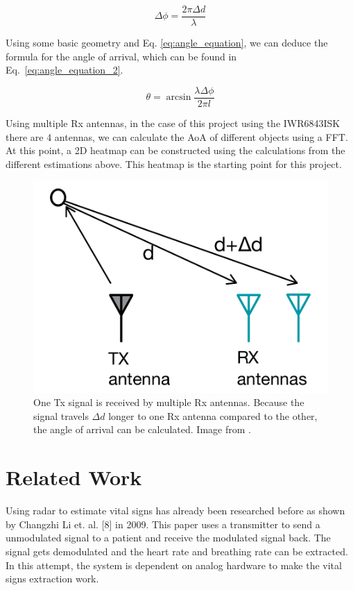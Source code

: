 \begin{equation}
\Delta \phi = \frac{2 \pi \Delta d}{\lambda}
\label{eq:angle_equation}
\end{equation}

Using some basic geometry and Eq. \ref{eq:angle_equation}, we can deduce the formula for the angle of arrival, which can be found in Eq.~\ref{eq:angle_equation_2}.

\begin{equation}
\theta = \arcsin{\frac{\lambda \Delta \phi}{2 \pi l}}
\label{eq:angle_equation_2}
\end{equation}

Using multiple Rx antennas, in the case of this project using the IWR6843ISK there are 4 antennas, we can calculate the AoA of different objects using a FFT. At this point, a 2D heatmap can be constructed using the calculations from the different estimations above. This heatmap is the starting point for this project.

\begin{figure}[t]
\centering
\includegraphics[width=.5\textwidth]{figures/background/angle_estimation.png}
\caption{One Tx signal is received by multiple Rx antennas. Because the signal travels $\Delta d$ longer to one Rx antenna compared to the other, the angle of arrival can be calculated. Image from \cite{mmwave_fundamentals_website}.}
\label{fig:angle_estimation}
\end{figure}

\section{Related Work}
\label{sec:related_work}
Using radar to estimate vital signs has already been researched before as shown by Changzhi Li et. al. [8] in 2009. This paper uses a transmitter to send a unmodulated signal to a patient and receive the modulated signal back. The signal gets demodulated and the heart rate and breathing rate can be extracted. In this attempt, the system is dependent on analog hardware to make the vital signs extraction work. 

